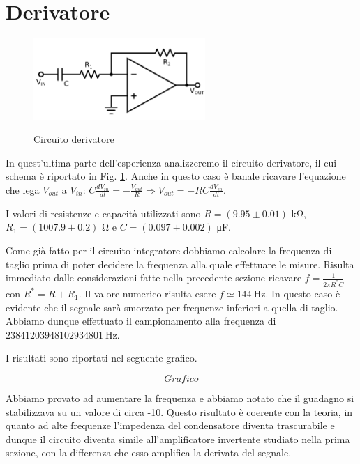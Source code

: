 \section{Derivatore}

\begin{figure}
	\caption{Circuito derivatore}
	\includegraphics[width=65mm]{ccder.pdf}
	\label{fig:ccder}
\end{figure}

In quest'ultima parte dell'esperienza analizzeremo il circuito derivatore, il cui schema è riportato in Fig. \ref{fig:ccder}.
Anche in questo caso è banale ricavare l'equazione che lega $V_{out}$ a $V_{in}$: $C\frac{dV_{in}}{dt}=-\frac{V_{out}}{R}\Rightarrow V_{out}=-RC\frac{dV_{in}}{dt}$.

I valori di resistenze e capacità utilizzati sono $R=(9.95 \pm 0.01)$ \si{\kilo\ohm}, $R_1=(1007.9 \pm 0.2)$ \si{\ohm} e $C=(0.097 \pm 0.002)$ \si{\micro\farad}.

Come già fatto per il circuito integratore dobbiamo calcolare la frequenza di taglio prima di poter decidere la frequenza alla quale effettuare le misure.
Risulta immediato dalle considerazioni fatte nella precedente sezione ricavare $f=\frac{1}{2 \pi R^* C}$ con $R^*=R+R_1$.
Il valore numerico risulta esere $f \simeq \SI{144}{\hertz}$.
In questo caso è evidente che il segnale sarà smorzato per frequenze inferiori a quella di taglio. Abbiamo dunque effettuato il campionamento alla frequenza di $\SI{23841203948102934801}{\hertz}$.

I risultati sono riportati nel seguente grafico.

$$Grafico$$

Abbiamo provato ad aumentare la frequenza e abbiamo notato che il guadagno si stabilizzava su un valore di circa -10.
Questo risultato è coerente con la teoria, in quanto ad alte frequenze l'impedenza del condensatore diventa trascurabile e dunque il circuito diventa simile all'amplificatore invertente studiato nella prima sezione, con la differenza che esso amplifica la derivata del segnale.